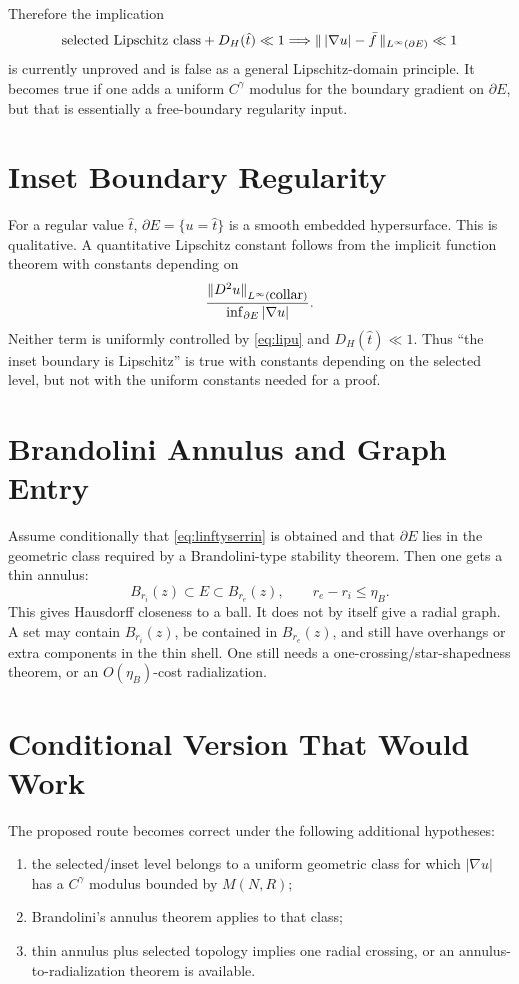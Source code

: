 \documentclass[11pt]{article}
\begin{document}
Therefore the implication
\[
   \hbox{selected Lipschitz class}+D_H(\hat t)\ll1
   \Longrightarrow
   \|\,|\nabla u|-\bar f\,\|_{L^\infty(\partial E)}\ll1
\]
is currently unproved and is false as a general Lipschitz-domain principle.
It becomes true if one adds a uniform \(C^\gamma\) modulus for the boundary
gradient on \(\partial E\), but that is essentially a free-boundary regularity
input.

\section{Inset Boundary Regularity}

For a regular value \(\hat t\), \(\partial E=\{u=\hat t\}\) is a smooth
embedded hypersurface.  This is qualitative.  A quantitative Lipschitz
constant follows from the implicit function theorem with constants depending
on
\[
   \frac{\|D^2u\|_{L^\infty(\hbox{collar})}}
        {\inf_{\partial E}|\nabla u|}.
\]
Neither term is uniformly controlled by \eqref{eq:lipu} and \(D_H(\hat t)\ll1\).
Thus ``the inset boundary is Lipschitz'' is true with constants depending on
the selected level, but not with the uniform constants needed for a proof.

\section{Brandolini Annulus and Graph Entry}

Assume conditionally that \eqref{eq:linftyserrin} is obtained and that
\(\partial E\) lies in the geometric class required by a Brandolini-type
stability theorem.  Then one gets a thin annulus:
\[
   B_{r_i}(z)\subset E\subset B_{r_e}(z),
   \qquad
   r_e-r_i\le \eta_B.
   \tag{7.1}
\]
This gives Hausdorff closeness to a ball.  It does not by itself give a radial
graph.  A set may contain \(B_{r_i}(z)\), be contained in \(B_{r_e}(z)\), and
still have overhangs or extra components in the thin shell.  One still needs a
one-crossing/star-shapedness theorem, or an \(O(\eta_B)\)-cost radialization.

\section{Conditional Version That Would Work}

The proposed route becomes correct under the following additional hypotheses:

\begin{enumerate}[label=\arabic*.]
\item the selected/inset level belongs to a uniform geometric class for which
\(|\nabla u|\) has a \(C^\gamma\) modulus bounded by \(M(N,R)\);
\item Brandolini's annulus theorem applies to that class;
\item thin annulus plus selected topology implies one radial crossing, or an
annulus-to-radialization theorem is available.
\end{enumerate}
\end{document}
